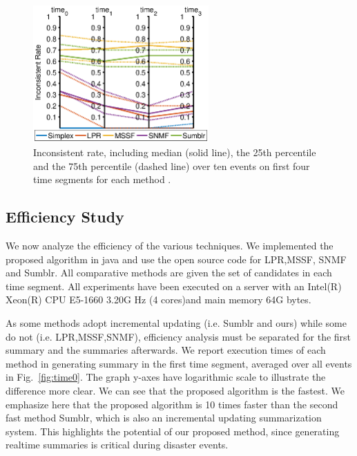 \documentclass[envcountsame]{llncs}
\begin{document}
\vspace{-0.3cm}
\begin{figure}
    \centering
    \includegraphics[width=0.6\textwidth]{conflictRatio.eps}
    \setlength{\abovecaptionskip}{-0.1cm}
    \caption{Inconsistent rate, including median (solid line), the  25th percentile and the 75th percentile (dashed line) over ten events on first four time segments for each method .}\label{fig:conflictRatio}
\end{figure}

\subsection{Efficiency Study}
We now analyze the efficiency of the various techniques. We implemented the proposed algorithm in java and use the open source code for LPR,MSSF, SNMF and Sumblr. All comparative methods are given the set of candidates in each time segment. All experiments have been executed on a server with an Intel(R) Xeon(R) CPU E5-1660 3.20G Hz (4 cores)and main memory 64G bytes.

As some methods adopt incremental updating (i.e. Sumblr and ours) while some do not (i.e. LPR,MSSF,SNMF), efficiency analysis must be separated for the first summary and the summaries afterwards. We report execution times of each method in generating summary in the first time segment, averaged over all events in Fig.~\ref{fig:time0}. The graph y-axes have logarithmic scale to illustrate the difference more clear. We can see that the proposed algorithm is the fastest. We emphasize here that the proposed algorithm is 10 times faster than the second fast method Sumblr, which is also an incremental updating summarization system.  This highlights the potential of our proposed method, since generating realtime summaries is critical during disaster events.
\end{document}

